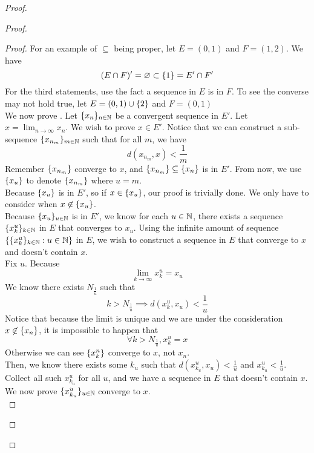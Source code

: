 \documentclass{report}
\begin{document}
\begin{proof}
\begin{proof}
\begin{proof}
For an example of $\subseteq$ being proper, let $E=(0,1)$ and $F=(1,2)$. We have 
\begin{equation}
  (E\cap F)'=\varnothing \subset \{ 1 \}=E'\cap F'
\end{equation}
For the third statements, use the fact a sequence in $E$ is in $F$. To see the converse may not hold true, let $E=(0,1)\cup \{ 2 \}$ and $F=(0,1)$\\

We now prove . Let $\{ x_n \}_{n\in\mathbb{N}}$ be a convergent sequence in $E'$. Let $x=\lim_{n\to\infty} x_n$. We wish to prove $x\in E'$. Notice that we can construct a sub-sequence $\{ x_{n_m} \}_{m \in\mathbb{N}}$ such that for all $m$, we have 
 \begin{equation}
d(x_{n_m},x)<\frac{1}{m}
\end{equation}
Remember $\{ x_{n_m} \}$ converge to $x$, and $\{ x_{n_m} \}\subseteq \{ x_n \}$ is in $E'$. From now, we use $\{ x_u \}$ to denote $\{ x_{n_m} \}$ where $u=m$.\\ 

Because $\{ x_u \}$ is in $E'$, so if  $x\in \{ x_u \}$, our proof is trivially done. We only have to consider when $x\not\in \{ x_u \}$.\\

Because $\{ x_u \}_{u\in\mathbb{N}}$ is in $E'$, we know for each  $u\in\mathbb{N}$, there exists a sequence  $\{ x^u_k \}_{k\in\mathbb{N}}$ in $E$ that converges to $x_u$. Using the infinite amount of sequence $\{ \{ x^u_k \}_{k\in\mathbb{N}}:u\in\mathbb{N} \}$ in $E$, we wish to construct a sequence in $E$ that converge to  $x$ and doesn't contain  $x$.\\

Fix $u$. Because 
\begin{equation}
\lim_{k\to\infty} x_k^u=x_u
\end{equation}
We know there exists $N_{\frac{1}{u}}$ such that
\begin{equation}
k>N_{\frac{1}{u}}\implies d(x_k^u,x_u)<\frac{1}{u}
\end{equation}
Notice that because the limit is unique and we are under the consideration $x\not\in \{ x_n \}$, it is impossible to happen that 
\begin{equation}
\forall k>N_{\frac{1}{u}}, x_k^u=x
\end{equation}
Otherwise we can see $\{ x^n_k \}$ converge to $x$, not  $x_n$.\\

Then, we know there exists some  $k_u$ such that  $d(x_{k_u}^u,x_u)<\frac{1}{u}$ and $x_{k_u}^u<\frac{1}{u}$. Collect all such $x^u_{k_u}$ for all $u$, and we have a sequence in  $E$ that doesn't contain $x$. We now prove $\{ x^u_{k_u} \}_{u\in\mathbb{N}}$ converge to $x$.\\


\end{proof}
\end{proof}
\end{proof}
\end{document}
